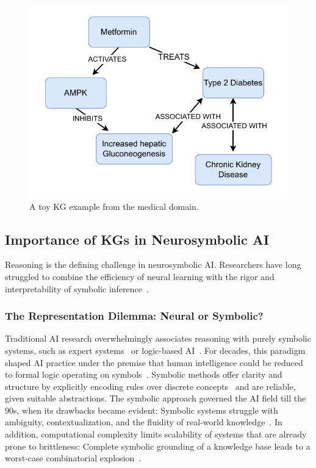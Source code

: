 \documentclass[10pt]{article}
\begin{document}
\begin{figure}[t]
    \centering
    \includegraphics[width=0.5\linewidth]{pictures/toy_kg.pdf}
    \caption{A toy KG example from the medical domain.}
    \label{fig:toy_kg}
\end{figure}

\subsection{Importance of KGs in Neurosymbolic AI}
\label{kg_for_ns_ai}
Reasoning is the defining challenge in neurosymbolic AI. Researchers have long struggled to combine the efficiency of neural learning with the rigor and interpretability of symbolic inference~\cite{ZHANG202114}.

\subsubsection{The Representation Dilemma: Neural or Symbolic?}
\label{subsubsec:neu_or_symb}

Traditional AI research overwhelmingly associates reasoning with purely symbolic systems, such as expert systems~\cite{MYCIN1978_313, DENDRAL-1993209} or logic-based AI~\cite{MCCARTHY198027, prolog_1996}. For decades, this paradigm shaped AI practice under the premise that human intelligence could be reduced to formal logic operating on symbols~\cite{newell_simon, haugeland1985artificial}. Symbolic methods offer clarity and structure by explicitly encoding rules over discrete concepts~\cite{newell_simon} and are reliable, given suitable abstractions. The symbolic approach governed the AI field till the 90s, when its drawbacks became evident: Symbolic systems struggle with ambiguity, contextualization, and the fluidity of real-world knowledge~\cite{HARNAD_1990}. In addition, computational complexity limits scalability of systems that are already prone to brittleness: Complete symbolic grounding of a knowledge base leads to a worst-case combinatorial explosion~\cite{CHEN1994467}.
\end{document}
